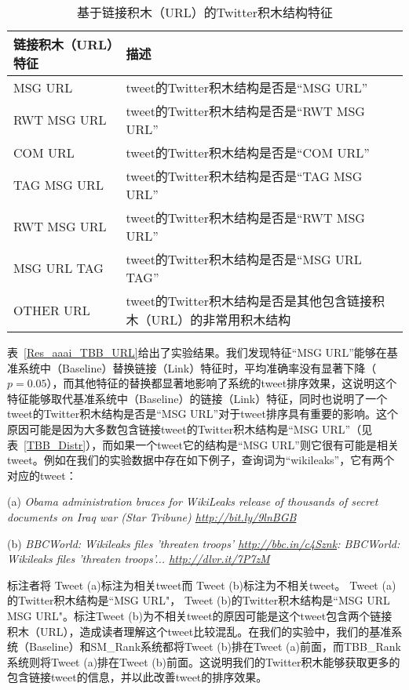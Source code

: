 \begin{table}[htp]
 \centering
 \caption{基于链接积木（URL）的Twitter积木结构特征}
 \label{URL_aaai_fea}
 \begin{tabular}{|lp{4.0in}|}
 \hline
 \textbf{链接积木（URL）特征} & \textbf{描述} \\
 \hline
MSG URL & tweet的Twitter积木结构是否是“MSG URL” \\     
RWT MSG URL&  tweet的Twitter积木结构是否是“RWT MSG URL” \\     
COM URL &  tweet的Twitter积木结构是否是“COM URL”\\     
TAG MSG URL&  tweet的Twitter积木结构是否是“TAG MSG URL” \\      
RWT MSG URL &  tweet的Twitter积木结构是否是“RWT MSG URL”\\                      
MSG URL TAG &  tweet的Twitter积木结构是否是“MSG URL TAG”\\    
OTHER URL &  tweet的Twitter积木结构是否是其他包含链接积木（URL）的非常用积木结构\\               
 \hline
 \end{tabular}
\end{table}

表~\ref{Res_aaai_TBB_URL}给出了实验结果。我们发现特征“MSG URL”能够在基准系统中（Baseline）替换链接（Link）特征时，平均准确率没有显著下降（$p=0.05$），而其他特征的替换都显著地影响了系统的tweet排序效果，这说明这个特征能够取代基准系统中（Baseline）的链接（Link）特征，同时也说明了一个tweet的Twitter积木结构是否是“MSG URL”对于tweet排序具有重要的影响。这个原因可能是因为大多数包含链接tweet的Twitter积木结构是“MSG URL”（见表~\ref{TBB_Distr}），而如果一个tweet它的结构是“MSG URL”则它很有可能是相关tweet。例如在我们的实验数据中存在如下例子，查询词为“wikileaks”，它有两个对应的tweet：

\begin{description}
\item{(a)} \emph{Obama administration braces for WikiLeaks release of thousands
	of secret documents on Iraq war (Star Tribune) \url{http://bit.ly/9lnBGB}}

\item{(b)} \emph{BBCWorld: Wikileaks files 'threaten troops'
	\url{http://bbc.in/c4Sznk}: BBCWorld: Wikileaks files 'threaten troops'...
	\url{http://dlvr.it/7P7zM}}
\end{description}

标注者将 Tweet (a)标注为相关tweet而 Tweet (b)标注为不相关tweet。 Tweet (a)的Twitter积木结构是“MSG URL"， Tweet (b)的Twitter积木结构是“MSG URL MSG URL"。标注Tweet (b)为不相关tweet的原因可能是这个tweet包含两个链接积木（URL），造成读者理解这个tweet比较混乱。在我们的实验中，我们的基准系统（Baseline）和SM\_Rank系统都将Tweet (b)排在Tweet (a)前面，而TBB\_Rank 系统则将Tweet (a)排在Tweet (b)前面。这说明我们的Twitter积木能够获取更多的包含链接tweet的信息，并以此改善tweet的排序效果。

